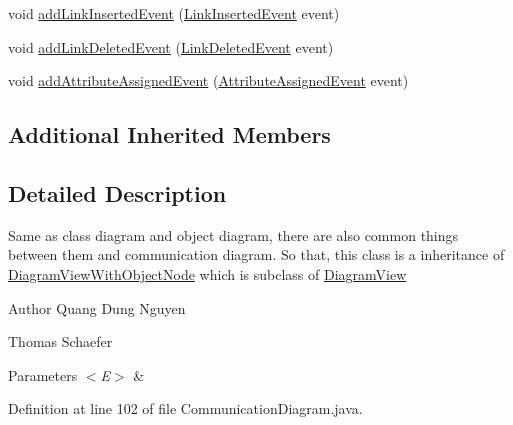\begin{DoxyCompactItemize}
\item 
void \hyperlink{classorg_1_1tzi_1_1use_1_1gui_1_1views_1_1diagrams_1_1behavior_1_1communicationdiagram_1_1_communication_diagram_ad6ba250921596b194ee5bf91df3e91bd}{add\-Link\-Inserted\-Event} (\hyperlink{classorg_1_1tzi_1_1use_1_1uml_1_1sys_1_1events_1_1_link_inserted_event}{Link\-Inserted\-Event} event)
\item 
void \hyperlink{classorg_1_1tzi_1_1use_1_1gui_1_1views_1_1diagrams_1_1behavior_1_1communicationdiagram_1_1_communication_diagram_a901220ff89b295c447a93acd0e8aa627}{add\-Link\-Deleted\-Event} (\hyperlink{classorg_1_1tzi_1_1use_1_1uml_1_1sys_1_1events_1_1_link_deleted_event}{Link\-Deleted\-Event} event)
\item 
void \hyperlink{classorg_1_1tzi_1_1use_1_1gui_1_1views_1_1diagrams_1_1behavior_1_1communicationdiagram_1_1_communication_diagram_a8efeca77f9fd5c711d8fd3c6d7cb156b}{add\-Attribute\-Assigned\-Event} (\hyperlink{classorg_1_1tzi_1_1use_1_1uml_1_1sys_1_1events_1_1_attribute_assigned_event}{Attribute\-Assigned\-Event} event)
\end{DoxyCompactItemize}
\subsection*{Additional Inherited Members}


\subsection{Detailed Description}
Same as class diagram and object diagram, there are also common things between them and communication diagram. So that, this class is a inheritance of \hyperlink{classorg_1_1tzi_1_1use_1_1gui_1_1views_1_1diagrams_1_1_diagram_view_with_object_node}{Diagram\-View\-With\-Object\-Node} which is subclass of \hyperlink{classorg_1_1tzi_1_1use_1_1gui_1_1views_1_1diagrams_1_1_diagram_view}{Diagram\-View} \begin{DoxyAuthor}{Author}
Quang Dung Nguyen 

Thomas Schaefer 
\end{DoxyAuthor}

\begin{DoxyParams}{Parameters}
{\em $<$\-E$>$} & \\
\hline
\end{DoxyParams}


Definition at line 102 of file Communication\-Diagram.\-java.



